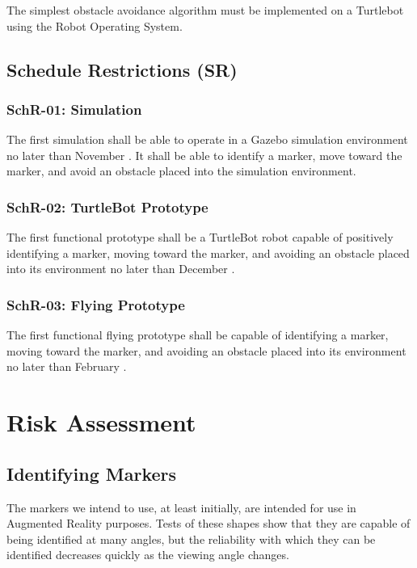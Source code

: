 \documentclass[]{report}
\begin{document}
The simplest obstacle avoidance algorithm must be implemented on a Turtlebot using the Robot Operating System.


\section{Schedule Restrictions (SR)}

\subsection{SchR-01: Simulation}

The first simulation shall be able to operate in a Gazebo simulation environment no later than November . It shall be able to identify a marker, move toward the marker, and avoid an obstacle placed into the simulation environment.

\subsection{SchR-02: TurtleBot Prototype}

The first functional prototype shall be a TurtleBot robot capable of positively identifying a marker, moving toward the marker, and avoiding an obstacle placed into its environment no later than December .

\subsection{SchR-03: Flying Prototype}

The first functional flying prototype shall be capable of identifying a marker, moving toward the marker, and avoiding an obstacle placed into its environment no later than February  .

\chapter{Risk Assessment}

\section{Identifying Markers}

The markers we intend to use, at least initially, are intended for use in Augmented Reality purposes. Tests of these shapes show that they are capable of being identified at many angles, but the reliability with which they can be identified decreases quickly as the viewing angle changes. 
\end{document}
